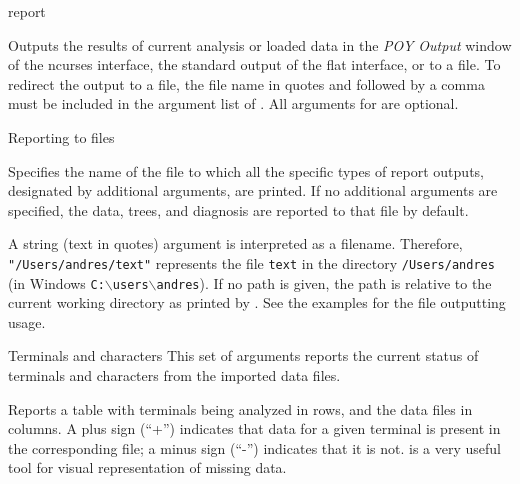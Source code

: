 \begin{command}{report}{}


	\begin{poydescription} 
        Outputs the results of current analysis or loaded data in the \emph{POY Output}
        window of the ncurses interface, the standard output of the flat
        interface, or to a file. To redirect the output to a file, the file name in 
        quotes and followed by a comma must be included in the argument list
        of . All arguments for  are
        optional. 
	\end{poydescription}

	\begin{arguments}

        \begin{argumentgroup}{Reporting to files}{}

                {Specifies the name of the file to which all the specific types of report outputs,
                designated by additional arguments, are printed. If no additional arguments
                are specified, the data, trees, and diagnosis are reported to that file by
                default.
                
                A string (text in quotes) argument is interpreted as a filename.
                Therefore, \texttt{"/Users/andres/text"} represents the file \texttt{text} in
                the directory \texttt{/Users/andres} (in Windows
                \texttt{C:$\backslash$users$\backslash$andres}). If no path is given, the path
                is relative to the current working directory as printed by
                . See the examples for the file outputting
                usage.} 
                {}
        \end{argumentgroup}
                
	\begin{argumentgroup}{Terminals and characters}
            {This set of arguments reports the current status of terminals and
            characters from the imported data files. }
		
                {Reports a table with terminals being analyzed in rows, and the
                data files in columns. A plus sign (``+'') indicates that data for a given
                terminal is
                present in the corresponding file; a minus sign (``-'') indicates that it is
                not.  is a very useful tool for visual
                representation of missing data.
                
}
\end{argumentgroup}
\end{arguments}
\end{command}

